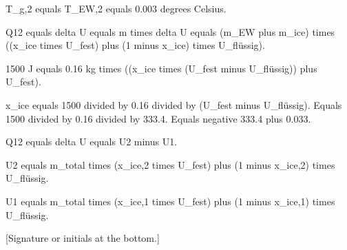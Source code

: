 T_g,2 equals T_EW,2 equals 0.003 degrees Celsius.  

Q12 equals delta U equals m times delta U equals (m_EW plus m_ice) times ((x_ice times U_fest) plus (1 minus x_ice) times U_flüssig).  

1500 J equals 0.16 kg times ((x_ice times (U_fest minus U_flüssig)) plus U_fest).  

x_ice equals 1500 divided by 0.16 divided by (U_fest minus U_flüssig).  
Equals 1500 divided by 0.16 divided by 333.4.  
Equals negative 333.4 plus 0.033.  

Q12 equals delta U equals U2 minus U1.  

U2 equals m_total times (x_ice,2 times U_fest) plus (1 minus x_ice,2) times U_flüssig.  

U1 equals m_total times (x_ice,1 times U_fest) plus (1 minus x_ice,1) times U_flüssig.  

[Signature or initials at the bottom.]
